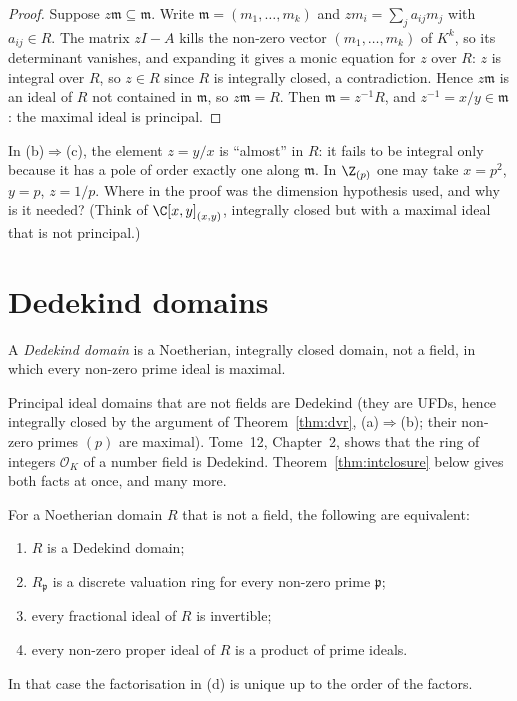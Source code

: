 \begin{proof}
Suppose $z\mathfrak m\subseteq\mathfrak m$. Write $\mathfrak m=(m_1,\dots,m_k)$ and $zm_i=\sum_ja_{ij}m_j$ with $a_{ij}\in R$. The matrix $zI-A$ kills the non-zero vector $(m_1,\dots,m_k)$ of $K^k$, so its determinant
vanishes, and expanding it gives a monic equation for $z$ over $R$: $z$ is integral over $R$, so $z\in R$ since $R$ is integrally closed, a contradiction. Hence $z\mathfrak m$ is an ideal of $R$ not contained in
$\mathfrak m$, so $z\mathfrak m=R$. Then $\mathfrak m=z^{-1}R$, and $z^{-1}=x/y\in\mathfrak m$: the maximal ideal is principal.
\end{proof}

\begin{think}
In (b)$\Rightarrow$(c), the element $z=y/x$ is ``almost'' in $R$: it fails to be integral only because it has a pole of order exactly one along $\mathfrak m$. In $\Z_{(p)}$ one may take $x=p^2$, $y=p$, $z=1/p$. Where in the proof
was the dimension hypothesis used, and why is it needed? (Think of $\C[x,y]_{(x,y)}$, integrally closed but with a maximal ideal that is not principal.)
\end{think}

\section{Dedekind domains}

\begin{definition}\label{def:dedekind}
A \emph{Dedekind domain} is a Noetherian, integrally closed domain, not a field, in which every non-zero prime ideal is maximal.
\end{definition}

Principal ideal domains that are not fields are Dedekind (they are UFDs, hence integrally closed by the argument of Theorem~\ref{thm:dvr}, (a)$\Rightarrow$(b); their non-zero primes $(p)$ are maximal). Tome~12, Chapter~2, shows
that the ring of integers $\mathcal O_K$ of a number field is Dedekind. Theorem~\ref{thm:intclosure} below gives both facts at once, and many more.

\begin{theorem}[Noether, 1927]\label{thm:dedekind}
For a Noetherian domain $R$ that is not a field, the following are equivalent:
\begin{enumerate}[label=(\alph*)]
\item $R$ is a Dedekind domain;
\item $R_{\mathfrak p}$ is a discrete valuation ring for every non-zero prime $\mathfrak p$;
\item every fractional ideal of $R$ is invertible;
\item every non-zero proper ideal of $R$ is a product of prime ideals.
\end{enumerate}
In that case the factorisation in (d) is unique up to the order of the factors.
\end{theorem}

